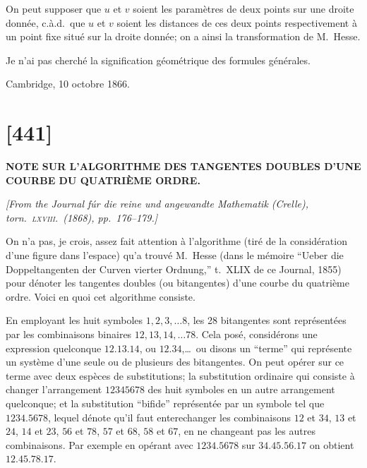 \documentclass[11pt,a4paper]{article}
\begin{document}
On peut supposer que $u$ et $v$ soient les param\`{e}tres de deux points sur une droite donn\'{e}e, c.\`{a}.d.\ que $u$ et $v$ soient les distances de ces deux points respectivement \`{a} un point fixe situ\'{e} sur la droite donn\'{e}e; on a ainsi la transformation de M.~Hesse.

Je n'ai pas cherch\'{e} la signification g\'{e}om\'{e}trique des formules g\'{e}n\'{e}rales.

Cambridge, 10 octobre 1866.

\newpage
\section*{[441]}

\begin{center}
\textbf{\Large NOTE SUR L'ALGORITHME DES TANGENTES DOUBLES D'UNE\\COURBE DU QUATRI\`{E}ME ORDRE.}
\end{center}

\begin{flushright}
\textit{[From the \textit{Journal f\'{u}r die reine und angewandte Mathematik} (Crelle),}\\
\textit{torn.\ \textsc{lxviii}.\ (1868), pp.\ 176--179.]}
\end{flushright}

\vspace{1em}

\noindent
On n'a pas, je crois, assez fait attention \`{a} l'algorithme (tir\'{e} de la consid\'{e}ration d'une figure dans l'espace) qu'a trouv\'{e} M.~Hesse (dans le m\'{e}moire ``Ueber die Doppeltangenten der Curven vierter Ordnung,'' t.\ XLIX de ce Journal, 1855) pour d\'{e}noter les tangentes doubles (ou bitangentes) d'une courbe du quatri\`{e}me ordre. Voici en quoi cet algorithme consiste.

En employant les huit symboles $1, 2, 3, \ldots 8$, les 28 bitangentes sont repr\'{e}sent\'{e}es par les combinaisons binaires $12, 13, 14, \ldots 78$. Cela pos\'{e}, consid\'{e}rons une expression quelconque $12.13.14$, ou $12.34$,\ldots\ ou disons un ``terme'' qui repr\'{e}sente un syst\`{e}me d'une seule ou de plusieurs des bitangentes. On peut op\'{e}rer sur ce terme avec deux esp\`{e}ces de substitutions; la substitution ordinaire qui consiste \`{a} changer l'arrangement $12345678$ des huit symboles en un autre arrangement quelconque; et la substitution ``bifide'' repr\'{e}sent\'{e}e par un symbole tel que $1234.5678$, lequel d\'{e}note qu'il faut enterechanger les combinaisons $12$ et $34$, $13$ et $24$, $14$ et $23$, $56$ et $78$, $57$ et $68$, $58$ et $67$, en ne changeant pas les autres combinaisons. Par exemple en op\'{e}rant avec $1234.5678$ sur $34.45.56.17$ on obtient $12.45.78.17$.
\end{document}
